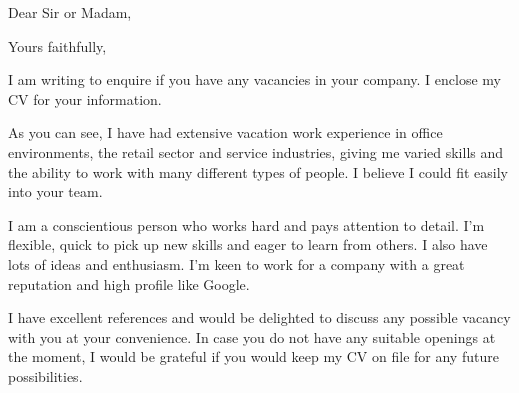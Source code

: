 \documentclass[11pt,a4paper,sans]{moderncv}        %
\begin{document}
\date{\today}
\opening{Dear Sir or Madam,}
\closing{Yours faithfully,}

\makelettertitle

I am writing to enquire if you have any vacancies in your company. I enclose my CV for your information.

As you can see, I have had extensive vacation work experience in office environments, the retail sector and service industries, giving me varied skills and the ability to work with many different types of people. I believe I could fit easily into your team.

I am a conscientious person who works hard and pays attention to detail. I'm flexible, quick to pick up new skills and eager to learn from others. I also have lots of ideas and enthusiasm. I'm keen to work for a company with a great reputation and high profile like Google.

I have excellent references and would be delighted to discuss any possible vacancy with you at your convenience. In case you do not have any suitable openings at the moment, I would be grateful if you would keep my CV on file for any future possibilities.


\makeletterclosing
\end{document}
